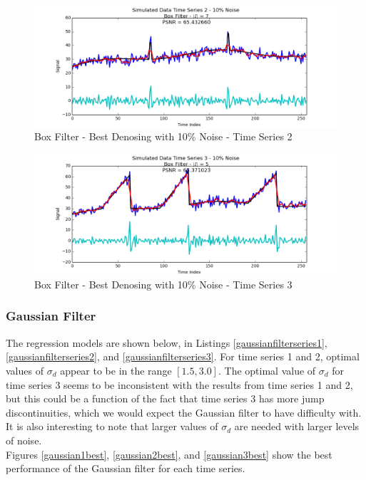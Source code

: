 \documentclass[11pt]{article}
\theoremstyle{definition}
\begin{document}
\begin{figure}
\centering
\includegraphics[width = 0.75 \textwidth]{BoxSignal2Best.png}
\caption{Box Filter - Best Denosing with 10\% Noise - Time Series 2}
\label{box2best}
\end{figure}

\begin{figure}
\centering
\includegraphics[width = 0.75 \textwidth]{BoxSignal3Best.png}
\caption{Box Filter - Best Denosing with 10\% Noise - Time Series 3}
\label{box3best}
\end{figure}

\newpage

\subsubsection{Gaussian Filter}

The regression models are shown below, in Listings \ref{gaussianfilterseries1}, \ref{gaussianfilterseries2}, and \ref{gaussianfilterseries3}. For time series 1 and 2, optimal values of $\sigma_d$ appear to be in the range $\left[ 1.5, 3.0 \right]$. The optimal value of $\sigma_d$ for time series 3 seems to be inconsistent with the results from time series 1 and 2, but this could be a function of the fact that time series 3 has more jump discontinuities, which we would expect the Gaussian filter to have difficulty with. It is also interesting to note that larger values of $\sigma_d$ are needed with larger levels of noise.\\

Figures \ref{gaussian1best}, \ref{gaussian2best}, and \ref{gaussian3best} show the best performance of the Gaussian filter for each time series.
\end{document}
